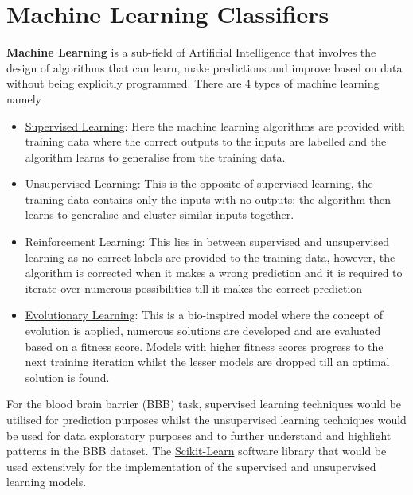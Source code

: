 \documentclass[a4paper,12pt]{report}
\begin{document}
\chapter{Machine Learning Classifiers}
	\textbf{Machine Learning} is a sub-field of Artificial Intelligence that involves the design of algorithms that can learn, make predictions and improve based on data without being explicitly programmed. There are 4 types of machine learning namely \cite{StephenM2014}
		\begin{itemize}
			\item \underline{Supervised Learning}: Here the machine learning algorithms are provided with training data where the correct outputs to the inputs are labelled and the algorithm learns to generalise from the training data.
			\item \underline{Unsupervised Learning}: This is the opposite of supervised learning, the training data contains only the inputs with no outputs; the algorithm then learns to generalise and cluster similar inputs together.
			\item \underline{Reinforcement Learning}: This lies in between supervised and unsupervised learning as no correct labels are provided to the training data, however, the algorithm is corrected when it makes a wrong prediction and it is required to iterate over numerous possibilities till it makes the correct prediction
			\item \underline{Evolutionary Learning}: This is a bio-inspired model where the concept of evolution is applied, numerous solutions are developed and are evaluated based on a fitness score. Models with higher fitness scores progress to the next training iteration whilst the lesser models are dropped till an optimal solution is found.
		\end{itemize}
	For the blood brain barrier (BBB) task, supervised learning techniques would be utilised for prediction purposes whilst the unsupervised learning techniques would be used for data exploratory purposes and to further understand and highlight patterns in the BBB dataset. The \href{http://scikit-learn.org/stable/}{Scikit-Learn} software library that would be used extensively for the implementation of the supervised and unsupervised learning models.
	
\end{document}
